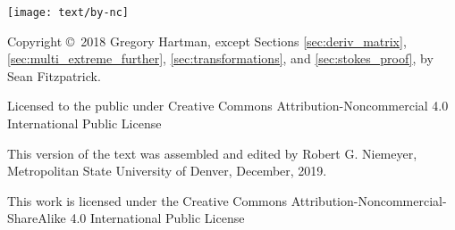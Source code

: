 \noindent\hskip -1in\begin{minipage}{2in}
\texttt{[image: text/by-nc]} 
\end{minipage}
%
\begin{minipage}{3in}
\noindent Copyright \copyright\ 2018 Gregory Hartman, except Sections \ref{sec:deriv_matrix}, \ref{sec:multi_extreme_further}, \ref{sec:transformations}, and \ref{sec:stokes_proof}, by Sean Fitzpatrick.

Licensed to the public under Creative Commons Attribution-Noncommercial 4.0 International Public License
\end{minipage}

\bigskip

\bigskip



\bigskip

\begin{minipage}{3.3in}
This version of the text was assembled and edited by Robert G. Niemeyer, Metropolitan State University of Denver, December, 2019.

This work is licensed under the Creative Commons Attribution-Noncommercial-ShareAlike 4.0 International Public License
\end{minipage}
